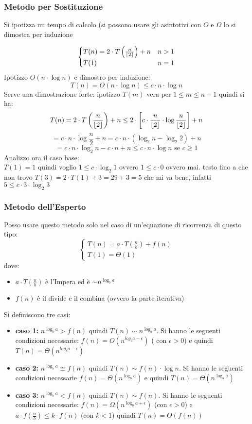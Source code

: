 \documentclass[a4paper,12pt,oneside,tikz]{book}
\DeclarePairedDelimiter\floor{\lfloor}{\rfloor}
\begin{document}
\subsubsection{Metodo per Sostituzione}
Si ipotizza un tempo di calcolo (si possono usare gli asintotivi con $O$ e $\Omega$ lo si dimostra per induzione
\begin{esempio}
$$\begin{cases}
T(n)=2\cdot T\left(\frac{n}{\floor{2}}\right)+n & n>1\\
T(1) & n=1
\end{cases}
$$
Ipotizzo $O(n\cdot \log n)$ e dimostro per induzione:
$$T(n)=O(n\cdot \log n)\leq c\cdot n\cdot \log n$$
Serve una dimostrazione forte:
ipotizzo $T(m)$ vera per $1\leq m\leq n-1$ quindi si ha:
$$T(n)=2\cdot T\left(\frac{n}{\floor{2}}\right)+n\leq 2\cdot\left[c\cdot \frac{n}{\floor{2}}\cdot \log \frac{n}{\floor{2}}\right]+n$$
$$=c\cdot n\cdot \log \frac{n}{2}+n=c\cdot n\cdot (\log_2 n-\log_2 2)+n$$ 
$$=c\cdot n\cdot \log_2 n-c\cdot n+n\leq c\cdot n\cdot \log n \mbox{ se } c\geq 1$$
\newpage
Analizzo ora il caso base:\\
$T(1)=1$ quindi voglio $1\leq c\cdot \log_2 1$ ovvero $1\leq c\cdot 0$ ovvero mai.
testo fino a che non trovo $T(3)=2\cdot T(1)+3=29+3=5$ che mi va bene, infatti $5\leq c\cdot 3\cdot \log_2 3$
\end{esempio}
\subsubsection{Metodo dell'Esperto}
Posso usare questo metodo solo nel caso di un'equazione di ricorrenza di questo tipo:
$$\begin{cases}
T(n)=a\cdot T\left(\frac{n}{b}\right) +f(n)\\
T(1)=\Theta(1)
\end{cases}$$
dove:
\begin{itemize}
\item $a\cdot T\left(\frac{n}{b}\right)$ è l'Impera ed è $\sim n^{\log_b a}$
\item $f(n)$ è il divide e il combina (ovvero la parte iterativa)
\end{itemize}
Si definiscono tre casi:
\begin{itemize}
\item \textbf{caso 1:} $n^{\log_b a}>f(n)$ quindi $T(n)\sim n^{\log_b a}$. Si hanno le seguenti condizioni necessarie: $f(n)=O(n^{log_b a -\epsilon})$ ( con $\epsilon>0$) e quindi $T(n)=\Theta(n^{log_b a -\epsilon})$
\item \textbf{caso 2:} $n^{\log_b a}\cong f(n)$ quindi $T(n)\sim f(n)\cdot \log n$. Si hanno le seguenti condizioni necessarie $f(n)=\Theta(n^{\log_b a})$ e quindi $T(n)=\Theta(n^{\log_b a})$
\item \textbf{caso 3:} $n^{\log_b a}< f(n)$ quindi $T(n)\sim f(n)$. Si hanno le seguenti condizioni necessarie: $f(n)=\Omega(n^{\log_b a +\epsilon})$ (con $\epsilon>0$) e $a\cdot f\left(\frac{n}{b}
\right)\leq k\cdot f(n)$ (con $k<1$) quindi $T(n)=\Theta(f(n))$
\end{itemize}
\end{document}

